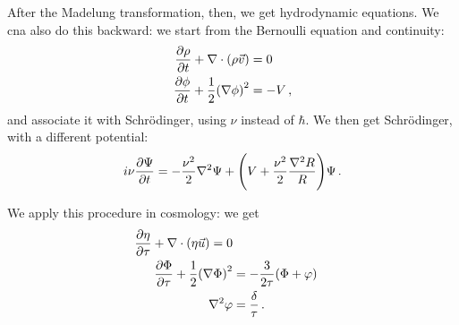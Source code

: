 \documentclass[main.tex]{subfiles}
\begin{document}
After the Madelung transformation, then, we get hydrodynamic equations. 
We cna also do this backward: we start from the Bernoulli equation and continuity: 
%
\begin{align}
\pdv{\rho }{t} + \nabla \cdot \qty(\rho \vec{v}) &= 0  \\
\pdv{\phi }{t} + \frac{1}{2} \qty(\nabla \phi )^2 &= -V 
\,,
\end{align}
%
and associate it with Schrödinger, using \(\nu \) instead of \(\hbar\). 
We then get Schrödinger, with a different potential: 
%
\begin{align}
i \nu \pdv{\Psi }{t} = - \frac{\nu^2}{2 } \nabla^2 \Psi + \qty(V + \frac{\nu^2}{2} \frac{\nabla^2 R}{R}) \Psi 
\,.
\end{align}

We apply this procedure in cosmology: we get 
%
\begin{align}
\pdv{\eta }{\tau } + \nabla \cdot \qty(\eta \vec{u}) = 0   \\
\pdv{\Phi  }{\tau } + \frac{1}{2} \qty(\nabla \Phi )^2 &= - \frac{3}{2 \tau } \qty(\Phi + \varphi )  \\
\nabla^2 \varphi &= \frac{\delta}{\tau }
\,.
\end{align}
\end{document}
